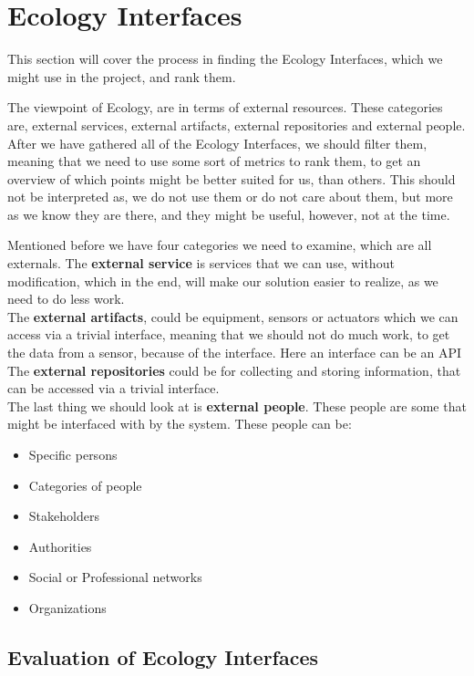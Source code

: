 \section{Ecology Interfaces}\label{sec:ecology-interface}
This section will cover the process in finding the Ecology Interfaces, which we might use in the project, and rank them.

The viewpoint of Ecology, are in terms of external resources.
These categories are, external services, external artifacts, external repositories and external people.
After we have gathered all of the Ecology Interfaces, we should filter them, meaning that we need to use some sort of metrics to rank them, to get an overview of which points might be better suited for us, than others.
This should not be interpreted as, we do not use them or do not care about them, but more as we know they are there, and they might be useful, however, not at the time.

Mentioned before we have four categories we need to examine, which are all externals.
The \textbf{external service} is services that we can use, without modification, which in the end, will make our solution easier to realize, as we need to do less work.\\
The \textbf{external artifacts}, could be equipment, sensors or actuators which we can access via a trivial interface, meaning that we should not do much work, to get the data from a sensor, because of the interface.
Here an interface can be an API\\
The \textbf{external repositories} could be for collecting and storing information, that can be accessed via a trivial interface.\\
The last thing we should look at is \textbf{external people}.
These people are some that might be interfaced with by the system.
These people can be:

\begin{itemize}
    \item Specific persons
    \item Categories of people
    \item Stakeholders
    \item Authorities
    \item Social or Professional networks
    \item Organizations
\end{itemize}

\subsection{Evaluation of Ecology Interfaces}

